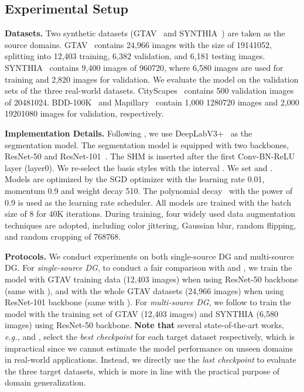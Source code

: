 \documentclass[runningheads]{llncs}
\begin{document}
\subsection{Experimental Setup}
\label{sec:seg_imple_details}

\noindent\textbf{Datasets.}
Two synthetic datasets (GTAV~\cite{gtav} and SYNTHIA~\cite{synthia}) are taken as the source domains.
GTAV~\cite{gtav} contains 24,966 images with the size of 19141052, splitting into 12,403 training, 6,382 validation, and 6,181 testing images. SYNTHIA~\cite{synthia} contains 9,400 images of 960720, where 6,580 images are used for training and 2,820 images for validation.
We evaluate the model on the validation sets of the three real-world datasets. CityScapes~\cite{cityscapes} contains 500 validation images of 20481024. BDD-100K~\cite{bdd} and Mapillary~\cite{mapillary} contain 1,000 1280720 images and 2,000 19201080 images for validation, respectively.

\noindent\textbf{Implementation Details.} Following \cite{robustnet}, we use DeepLabV3+~\cite{deeplab} as the segmentation model. The segmentation model is equipped with two backbones, ResNet-50 and ResNet-101~\cite{he2016deep}. The SHM is inserted after the first Conv-BN-ReLU layer (layer0). We re-select the basis styles with the interval . We set  and .
Models are optimized by the SGD optimizer with the learning rate 0.01, momentum 0.9 and weight decay 510. The polynomial decay~\cite{liu2015parsenet} with the power of 0.9 is used as the learning rate scheduler. All models are trained with the batch size of 8 for 40K iterations. 
During training, four widely used data augmentation techniques are adopted, including color jittering, Gaussian blur, random flipping, and random cropping of 768768. 


\noindent\textbf{Protocols.} We conduct experiments on both single-source DG and multi-source DG. For \textit{single-source DG}, to conduct a fair comparison with \cite{robustnet} and \cite{FSDR}, we train the model with GTAV training data (12,403 images) when using ResNet-50 backbone (same with \cite{robustnet}), and with the whole GTAV datasets (24,966 images) when using ResNet-101 backbone (same with \cite{FSDR}). For \textit{multi-source DG}, we follow \cite{robustnet} to train the model with the training set of GTAV (12,403 images) and SYNTHIA (6,580 images) using ResNet-50 backbone.
\textbf{Note that} several state-of-the-art works, \textit{e.g.,} \cite{FSDR} and \cite{DRPC}, select the \textit{best checkpoint} for each target dataset respectively, which is impractical since we cannot estimate the model performance on unseen domains in real-world applications. Instead, we directly use the \textit{last checkpoint} to evaluate the three target datasets, which is more in line with the practical purpose of domain generalization.
\end{document}
